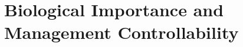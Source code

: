 \section{Biological Importance and Management Controllability}
\label{sec:importance-controllability}
